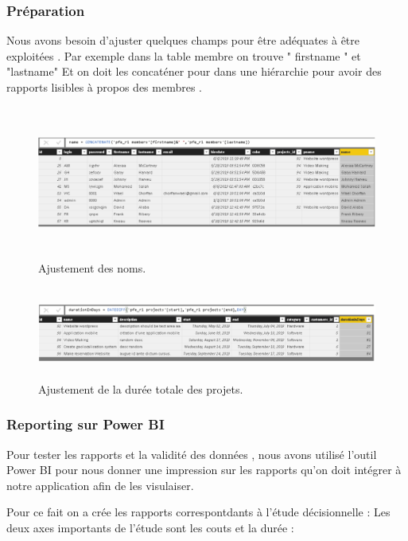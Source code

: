 \subsubsection{Pr\'{e}paration}
Nous avons besoin d'ajuster quelques champs pour \^{e}tre ad\'{e}quates \`{a} \^{e}tre
exploit\'{e}es . Par exemple dans la table membre on trouve " firstname " et
"lastname" Et on doit les concat\'{e}ner pour dans une hi\'{e}rarchie pour avoir
des rapports lisibles \`{a} propos des membres .




\FloatBarrier
\begin{figure}[H]
\center
\includegraphics[width=14cm,height=5cm]{./figures/pb1.png}
\caption{Ajustement des noms.}
\end{figure}
\FloatBarrier


\bigskip
\bigskip

\FloatBarrier
\begin{figure}[H]
\center
\includegraphics[width=14cm,height=3cm]{./figures/pb2.png}
\caption{Ajustement de la dur\'{e}e totale des projets.}
\end{figure}
\FloatBarrier

\newpage
\subsubsection{Reporting  sur Power BI}
Pour tester les rapports et la validit\'{e} des donn\'{e}es , nous avons utilis\'{e} l'outil
Power BI pour nous donner une impression sur les rapports qu'on doit
int\'{e}grer \`{a} notre application afin de les visulaiser.

\bigskip
Pour ce fait on a cr\'{e}e les rapports correspontdants \`{a} l'\'{e}tude d\'{e}cisionnelle :
Les deux axes importants de l'\'{e}tude sont les couts et la dur\'{e}e :



